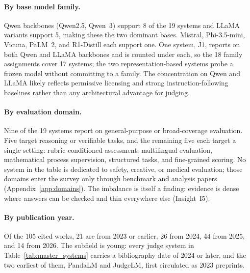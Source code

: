 \paragraph{By base model family.} Qwen backbones (Qwen2.5, Qwen~3) support 8 of the 19 systems and LLaMA variants support 5, making these the two dominant bases. Mistral, Phi-3.5-mini, Vicuna, PaLM~2, and R1-Distill each support one. One system, J1, reports on both Qwen and LLaMA backbones and is counted under each, so the 18 family assignments cover 17 systems; the two representation-based systems probe a frozen model without committing to a family. The concentration on Qwen and LLaMA likely reflects permissive licensing and strong instruction-following baselines rather than any architectural advantage for judging.

\paragraph{By evaluation domain.} Nine of the 19 systems report on general-purpose or broad-coverage evaluation. Five target reasoning or verifiable tasks, and the remaining five each target a single setting: rubric-conditioned assessment, multilingual evaluation, mathematical process supervision, structured tasks, and fine-grained scoring. No system in the table is dedicated to safety, creative, or medical evaluation; those domains enter the survey only through benchmark and analysis papers (Appendix~\ref{app:domains}). The imbalance is itself a finding: evidence is dense where answers can be checked and thin everywhere else (Insight~I5).

\paragraph{By publication year.} Of the 105 cited works, 21 are from 2023 or earlier, 26 from 2024, 44 from 2025, and 14 from 2026. The subfield is young: every judge system in Table~\ref{tab:master_systems} carries a bibliography date of 2024 or later, and the two earliest of them, PandaLM and JudgeLM, first circulated as 2023 preprints.
